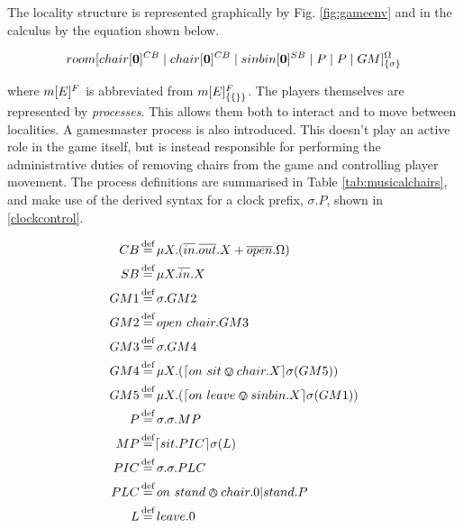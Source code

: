 The locality structure is represented graphically by Fig. \ref{fig:gameenv}
and in the calculus by the equation shown below.

\begin{equation}
{room}[ {chair}[ \textbf{0} ]^{CB} \;|\; {chair}[ \textbf{0} ]^{CB}
\;|\; {sin bin}[ \textbf{0} ]^{SB} \;|\; P \;|\; P \;|\; GM ]^{\Omega}_{\{\sigma\}}
\end{equation}

\noindent where ${m}[ E ]^{F}$ is abbreviated from
${m}[ E ]^{F}_{\{\{\}\}}$.  The players themselves are represented by
\emph{processes}.  This allows them both to interact and to move between
localities.  A gamesmaster process is also introduced.  This doesn't
play an active role in the game itself, but is instead responsible for
performing the administrative duties of removing chairs from the game
and controlling player movement.  The process definitions are summarised
in Table \ref{tab:musicalchairs}, and make use of the derived syntax for
a clock prefix, $\sigma.P$, shown in \ref{clockcontrol}.

\begin{table}[h]
  \caption{Summary of Processes and Derived Syntax for Musical Chairs}
  \label{tab:musicalchairs}
  \shrule
  \begin{align}
   CB &
    \operatorname{\stackrel{\textrm{def}}{=}} 
    \mu X.(\overline{in}.\overline{out}.X + \overline{open}.\Omega) \label{chairb} \\
   SB &
    \operatorname{\stackrel{\textrm{def}}{=}} 
    \mu X.\overline{in}.X \label{sinb} \\
   GM1 &
    \operatorname{\stackrel{\textrm{def}}{=}} 
    \sigma.GM2 \label{gmstage2} \\
    GM2 &
    \operatorname{\stackrel{\textrm{def}}{=}} 
    open\ chair.GM3 \label{gmstage3} \\
   GM3 &
   \operatorname{\stackrel{\textrm{def}}{=}}
   \sigma.GM4 \label{gmstage4} \\
   GM4 &
    \operatorname{\stackrel{\textrm{def}}{=}}  
    \mu X.(\lceil{on\ sit \varovee chair.X}\rceil {\sigma} ({GM5})) \label{gmstage5} \\
   GM5 &
    \operatorname{\stackrel{\textrm{def}}{=}} 
    \mu X.(\lceil{on\ leave \varovee sinbin.X}\rceil {\sigma} ({GM1})) \label{gmstage6}\\
    P &
    \operatorname{\stackrel{\textrm{def}}{=}} 
    \sigma.\sigma.MP \label{player} \\
    MP &
    \operatorname{\stackrel{\textrm{def}}{=}}
    \lceil{sit.PIC}\rceil {\sigma} ({L}) \label{mplayer}\\
   PIC &
    \operatorname{\stackrel{\textrm{def}}{=}} 
    \sigma.\sigma.PLC \label{pinchair} \\
   PLC &
   \operatorname{\stackrel{\textrm{def}}{=}}
   on\ stand \varowedge chair.0|stand.P \label{pleavechair} \\
   L &
    \operatorname{\stackrel{\textrm{def}}{=}} 
    leave.0 \label{loser} 
  \end{align}
  \shrule
\end{table}

